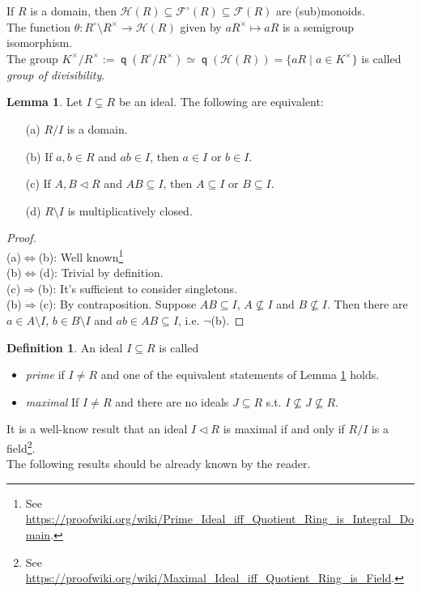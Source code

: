 \documentclass[12pt,a4paper]{report}
\theoremstyle{definition}
\newtheorem{lemma}[theorem]{Lemma}
\newtheorem{defn}[theorem]{Definition}
\theoremstyle{num.custom-title}
\DeclareMathOperator{\imp}{\Rightarrow}
\DeclareMathOperator{\sm}{\setminus}
\DeclareMathOperator{\sse}{\subseteq}
\DeclareMathOperator{\q}{\mathsf{q}}
\newcommand{\F}{\mathcal{F}}
\renewcommand{\H}{\mathcal{H}}
\renewcommand{\iff}{\Leftrightarrow}
\begin{document}
If $R$ is a domain, then $\H(R) \sse \F^\circ(R) \sse \F(R)$ are (sub)monoids.\\
The function $\theta : R^\circ \sm R^\times \to \H(R)$ given by $aR^\times \mapsto aR$ is a semigroup isomorphism.\\
The group $K^\times / R^\times := \q(R^\circ / R^\times) \simeq \q(\H(R)) = \{aR \mid a \in K^\times\}$ is called \emph{group of divisibility}.

\begin{lemma}\label{char_prime_ideals}
Let $I \subsetneq R$ be an ideal. The following are equivalent:
\begin{enumerate}
\item[(a)] $R/I$ is a domain.
\item[(b)] If $a,b \in R$ and $ab \in I$, then $a \in I$ or $b \in I$.
\item[(c)] If $A,B \lhd R$ and $AB \sse I$, then $A \sse I$ or $B \sse I$.
\item[(d)] $R \sm I$ is multiplicatively closed.
\end{enumerate}
\begin{proof}\ \\
(a)$\iff$(b): Well known\footnote{See \url{https://proofwiki.org/wiki/Prime_Ideal_iff_Quotient_Ring_is_Integral_Domain}.}\\
(b)$\iff$(d): Trivial by definition.\\
(c)$\imp$(b): It's sufficient to consider singletons.\\
(b)$\imp$(c): By contraposition. Suppose $AB \sse I$, $A \nsubseteq I$ and $B \nsubseteq I$. Then there are $a \in A \sm I$, $b \in B \sm I$ and $ab \in AB \sse I$, i.e. $\neg$(b).
\end{proof}
\end{lemma}

\begin{defn}
An ideal $I \sse R$ is called
\begin{itemize}
\item \emph{prime} if $I \neq R$ and one of the equivalent statements of Lemma \ref{char_prime_ideals} holds.
\item \emph{maximal} If $I \neq R$ and there are no ideals $J \sse R$ s.t. $I \nsubseteq J \nsubseteq R$.
\end{itemize}
\end{defn}

It is a well-know result that an ideal $I \lhd R$ is maximal if and only if $R/I$ is a field\footnote{See \url{https://proofwiki.org/wiki/Maximal_Ideal_iff_Quotient_Ring_is_Field}.}.\\
The following results should be already known by the reader.
\end{document}
